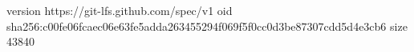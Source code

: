 version https://git-lfs.github.com/spec/v1
oid sha256:c00fe06fcaec06e63fe5adda263455294f069f5f0cc0d3be87307cdd5d4e3cb6
size 43840
